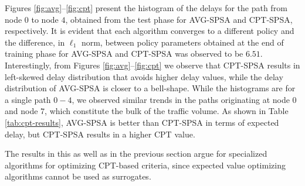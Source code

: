 
Figures \ref{fig:avg}--\ref{fig:cpt} present the histogram of the delays for the path from node $0$ to node $4$, obtained from the test phase for AVG-SPSA and CPT-SPSA, respectively.  
It is evident that each algorithm converges to a different policy and the difference, in $\ell_1$ norm, between policy parameters obtained at the end of training phase for AVG-SPSA and CPT-SPSA was observed to be $6.51$. 
Interestingly, from Figures \ref{fig:avg}--\ref{fig:cpt} we observe that CPT-SPSA results in left-skewed delay distribution that avoids higher delay values, while the delay distribution of AVG-SPSA is closer to a bell-shape. While the histograms are for a single path $0-4$, we observed similar trends in the paths originating at node $0$ and node $7$, which constitute the bulk of the traffic volume. As shown in Table \ref{tab:cpt-results}, AVG-SPSA is better than CPT-SPSA in terms of expected delay, but CPT-SPSA results in a higher CPT value.

The results in this as well as in the previous section argue for specialized algorithms for optimizing CPT-based criteria, since expected value optimizing algorithms cannot be used as surrogates. 


